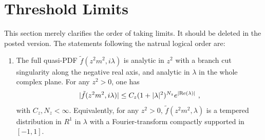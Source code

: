 \documentclass[a4paper,11pt]{article}
\begin{document}
\section{Threshold Limits}
This section merely clarifies the order of taking limits. It should be deleted in the posted version. The statements following the natrual logical order are: 
\begin{enumerate}
    \item The full quasi-PDF $\tilde f(z^2m^2,i\lambda)$ is analytic in $z^2$ with a branch cut singularity along the negative real axis, and analytic in $\lambda$ in the whole complex plane. For any $z^2>0$, one has
\begin{align}
|\tilde f(z^2m^2,i\lambda)|\le C_z(1+|\lambda|^2)^{N_z} e^{|{\rm Re}(\lambda)|} \ ,
\end{align}
   with $C_z,N_z<\infty$. Equivalently, for any $z^2>0$, $\tilde f(z^2m^2,\lambda)$ is a tempered distribution in $R^1$ in $\lambda$ with a Fourier-transform compactly supported in $[-1,1]$.  
    

\end{enumerate}
\end{document}
